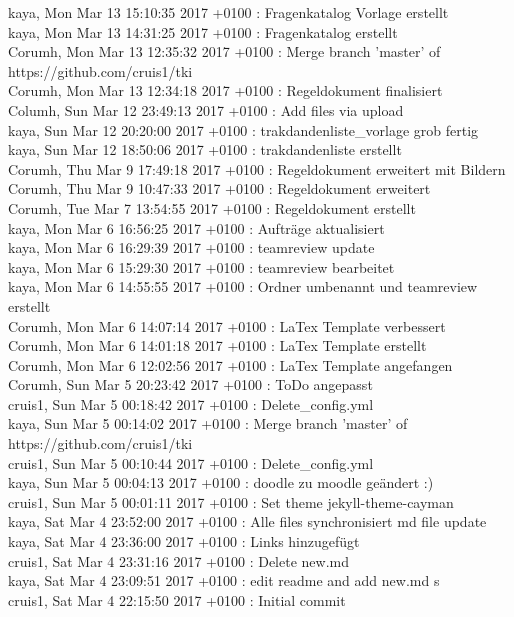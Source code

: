 kaya, Mon Mar 13 15:10:35 2017 +0100 : Fragenkatalog Vorlage erstellt\\
kaya, Mon Mar 13 14:31:25 2017 +0100 : Fragenkatalog erstellt\\
Corumh, Mon Mar 13 12:35:32 2017 +0100 : Merge branch 'master' of https://github.com/cruis1/tki\\
Corumh, Mon Mar 13 12:34:18 2017 +0100 : Regeldokument finalisiert\\
Columh, Sun Mar 12 23:49:13 2017 +0100 : Add files via upload\\
kaya, Sun Mar 12 20:20:00 2017 +0100 : trakdandenliste\_vorlage grob fertig\\
kaya, Sun Mar 12 18:50:06 2017 +0100 : trakdandenliste erstellt\\
Corumh, Thu Mar 9 17:49:18 2017 +0100 : Regeldokument erweitert mit Bildern\\
Corumh, Thu Mar 9 10:47:33 2017 +0100 : Regeldokument erweitert\\
Corumh, Tue Mar 7 13:54:55 2017 +0100 : Regeldokument erstellt\\
kaya, Mon Mar 6 16:56:25 2017 +0100 : Aufträge aktualisiert\\
kaya, Mon Mar 6 16:29:39 2017 +0100 : teamreview update\\
kaya, Mon Mar 6 15:29:30 2017 +0100 : teamreview bearbeitet\\
kaya, Mon Mar 6 14:55:55 2017 +0100 : Ordner umbenannt und teamreview erstellt\\
Corumh, Mon Mar 6 14:07:14 2017 +0100 : LaTex Template verbessert\\
Corumh, Mon Mar 6 14:01:18 2017 +0100 : LaTex Template erstellt\\
Corumh, Mon Mar 6 12:02:56 2017 +0100 : LaTex Template angefangen\\
Corumh, Sun Mar 5 20:23:42 2017 +0100 : ToDo angepasst\\
cruis1, Sun Mar 5 00:18:42 2017 +0100 : Delete\_config.yml\\
kaya, Sun Mar 5 00:14:02 2017 +0100 : Merge branch 'master' of https://github.com/cruis1/tki\\
cruis1, Sun Mar 5 00:10:44 2017 +0100 : Delete\_config.yml\\
kaya, Sun Mar 5 00:04:13 2017 +0100 : doodle zu moodle geändert :)\\
cruis1, Sun Mar 5 00:01:11 2017 +0100 : Set theme jekyll-theme-cayman\\
kaya, Sat Mar 4 23:52:00 2017 +0100 : Alle files synchronisiert md file update\\
kaya, Sat Mar 4 23:36:00 2017 +0100 : Links hinzugefügt\\
cruis1, Sat Mar 4 23:31:16 2017 +0100 : Delete new.md\\
kaya, Sat Mar 4 23:09:51 2017 +0100 : edit readme and add new.md s\\
cruis1, Sat Mar 4 22:15:50 2017 +0100 : Initial commit\\


